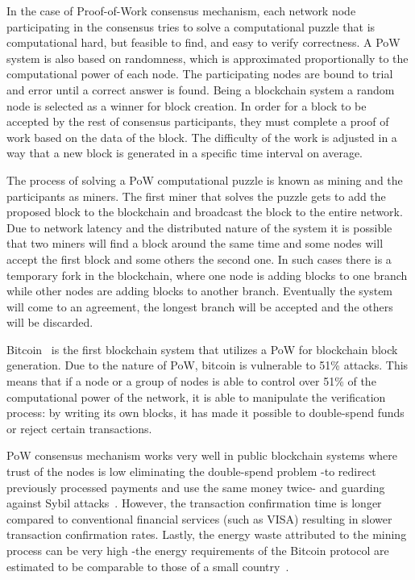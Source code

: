 In the case of Proof-of-Work consensus mechanism, each network node participating in
the consensus tries to solve a computational puzzle that is computational hard, but feasible to find, and easy to verify correctness.
A PoW system is also based on randomness, which is approximated proportionally to the computational power of each node.
The participating nodes are bound to trial and error until a correct answer is found. Being a blockchain system a random node is selected as a winner for block creation.
In order for a block to be accepted by the rest of consensus participants, they must complete a proof of work based on the data of the block.
The difficulty of the work is adjusted in a way that a new block is generated in a specific time interval on average.

The process of solving a PoW computational puzzle is known as mining and the participants as miners.
The first miner that solves the puzzle gets to add the proposed block to the blockchain and broadcast
the block to the entire network. Due to network latency and the distributed nature of the system it is possible that two miners will
find a block around the same time and some nodes will accept the first block and some others the second one. In such cases there is a temporary
fork in the blockchain, where one node is adding blocks to one branch while other nodes are adding blocks to another branch. Eventually the
system will come to an agreement, the longest branch will be accepted and the others will be discarded.

Bitcoin~\cite{Zohar:2015:BUH:2817191.2701411} is the first blockchain system that utilizes a PoW for blockchain block generation. Due to the nature of PoW, bitcoin is vulnerable to 51\% attacks.
This means that if a node or a group of nodes is able to control over 51\% of the computational power of the network, it is able to manipulate
the verification process: by writing its own blocks, it has made it possible to double-spend funds or reject certain transactions.

PoW consensus mechanism works very well in public blockchain systems where trust of the nodes is low eliminating
the double-spend problem -to redirect previously processed payments and use the same money twice- and guarding against Sybil attacks~\cite{Vu:2009:PCP:1671222}.
However, the transaction confirmation time is longer compared to conventional financial services (such as VISA)\cite{Sompolinsky2015,Zohar:2015:BUH:2817191.2701411,DBLP:journals/corr/abs-1708-05665} resulting
in slower transaction confirmation rates. Lastly, the energy waste attributed to the mining process can be very high -the energy requirements
of the Bitcoin protocol are estimated to be comparable to those of a small country~\cite{6912770}.


